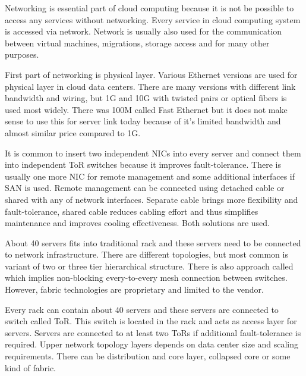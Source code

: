 

Networking is essential part of cloud computing because it is not be possible to access any services without networking. Every service in cloud computing system is accessed via network. Network is usually also used for the communication between virtual machines, migrations, storage access and for many other purposes.


First part of networking is physical layer. Various Ethernet versions are used for physical layer in cloud data centers. There are many versions with different link bandwidth and wiring, but 1G and 10G with twisted pairs or optical fibers is used most widely. There was 100M called Fast Ethernet but it does not make sense to use this for server link today because of it's limited bandwidth and almost similar price compared to 1G.

It is common to insert two independent \Ac{NIC}s into every server and connect them into independent \Ac{ToR} switches because it improves fault-tolerance. There is usually one more \Ac{NIC} for remote management and some additional interfaces if \Ac{SAN} is used. Remote management can be connected using detached cable or shared with any of network interfaces. Separate cable brings more flexibility and fault-tolerance, shared cable reduces cabling effort and thus simplifies maintenance and improves cooling effectiveness. Both solutions are used. 

About 40 servers fits into traditional rack and these servers need to be connected to network infrastructure. There are different topologies, but most common is variant of two or three tier hierarchical structure. \cite{survey-architectures} There is also approach called  which implies non-blocking every-to-every mesh connection between switches. However, fabric technologies are proprietary and limited to the vendor. 

Every rack can contain about 40 servers and these servers are connected to switch called \Ac{ToR}. This switch is located in the rack and acts as access layer for servers. Servers are connected to at least two \Ac{ToR}s if additional fault-tolerance is required. Upper network topology layers depends on data center size and scaling requirements. There can be distribution and core layer, collapsed core or some kind of fabric.


